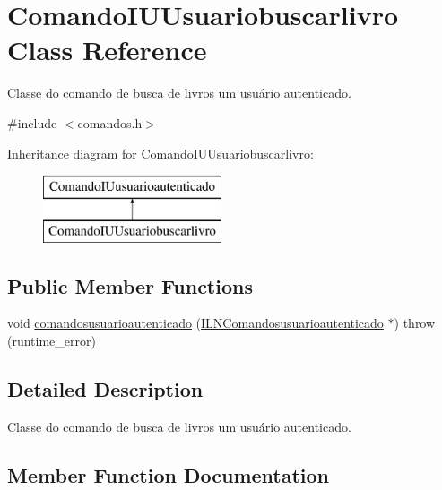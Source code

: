 \hypertarget{classComandoIUUsuariobuscarlivro}{}\section{Comando\+I\+U\+Usuariobuscarlivro Class Reference}
\label{classComandoIUUsuariobuscarlivro}


Classe do comando de busca de livros um usuário autenticado.  




{\ttfamily \#include $<$comandos.\+h$>$}

Inheritance diagram for Comando\+I\+U\+Usuariobuscarlivro\+:\begin{figure}[H]
\begin{center}
\leavevmode
\includegraphics[height=2.000000cm]{classComandoIUUsuariobuscarlivro}
\end{center}
\end{figure}
\subsection*{Public Member Functions}
\begin{DoxyCompactItemize}
\item 
void \hyperlink{classComandoIUUsuariobuscarlivro_a366a108bac44b73daa0777557811e514}{comandosusuarioautenticado} (\hyperlink{classILNComandosusuarioautenticado}{I\+L\+N\+Comandosusuarioautenticado} $\ast$)  throw (runtime\+\_\+error)
\end{DoxyCompactItemize}


\subsection{Detailed Description}
Classe do comando de busca de livros um usuário autenticado. 

\subsection{Member Function Documentation}
\mbox{\label{classComandoIUUsuariobuscarlivro_a366a108bac44b73daa0777557811e514}} 
